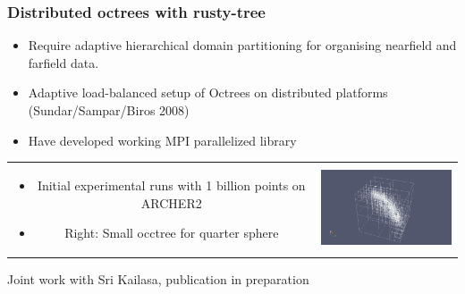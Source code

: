 \documentclass[dvipsnames,10pt]{beamer}
\begin{document}
	\begin{frame}
		\frametitle{Distributed octrees with rusty-tree}
		
		\begin{itemize}
		\item Require adaptive hierarchical domain partitioning for organising nearfield
		and farfield data.
		\item Adaptive load-balanced setup of Octrees on distributed platforms (Sundar/Sampar/Biros 2008)
		\item Have developed working MPI parallelized library
	\end{itemize}

	\begin{center}
		\begin{tabular}{cc}
			\begin{minipage}{5cm}
				\vspace{-3cm}
				\begin{itemize}
					\item Initial experimental runs with {\color{red}1 billion} points on ARCHER2
					\item Right: Small occtree for quarter sphere
				\end{itemize}
			\end{minipage} &
		\includegraphics[width=5cm]{../figs/quarter_sphere}
		\end{tabular}
	\end{center}

	\begin{small}
		Joint work with Sri Kailasa, publication in preparation
	\end{small}

	\end{frame}
	
\end{document}
